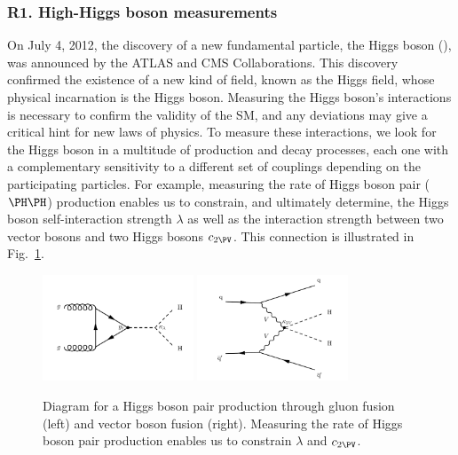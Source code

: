 \documentclass[11pt,letterpaper,notitlepage]{article}
\begin{document}
\vspace{-1ex}
\subsubsection*{R1. High-\pt Higgs boson measurements}

On July 4, 2012, the discovery of a new fundamental particle, the Higgs boson (\PH), was announced by the ATLAS and CMS Collaborations.
This discovery confirmed the existence of a new kind of field, known as the Higgs field, whose physical incarnation is the Higgs boson.
Measuring the Higgs boson's interactions is necessary to confirm the validity of the SM, and any deviations may give a critical hint for new laws of physics.
To measure these interactions, we look for the Higgs boson in a multitude of production and decay processes, each one with a complementary sensitivity to a different set of couplings depending on the participating particles.
For example, measuring the rate of Higgs boson pair ($\PH\PH$) production enables us to constrain, and ultimately determine, the Higgs boson self-interaction strength $\lambda$ as well as the interaction strength between two vector bosons and two Higgs bosons $c_{2\PV}$.
This connection is illustrated in Fig.~\ref{fig:higgs}.

\begin{figure}[htb]
    \centering
    \includegraphics[width=0.4\textwidth]{CMS-PAS-HIG-23-012_Figure_001-a.pdf}
    \includegraphics[width=0.4\textwidth]{CMS-PAS-HIG-23-012_Figure_001-e.pdf}
    \caption{
        Diagram for a Higgs boson pair production through gluon fusion (left) and vector boson fusion (right).
        Measuring the rate of Higgs boson pair production enables us to constrain $\lambda$ and $c_{2\PV}$.
        \label{fig:higgs}}
\end{figure}
\end{document}
